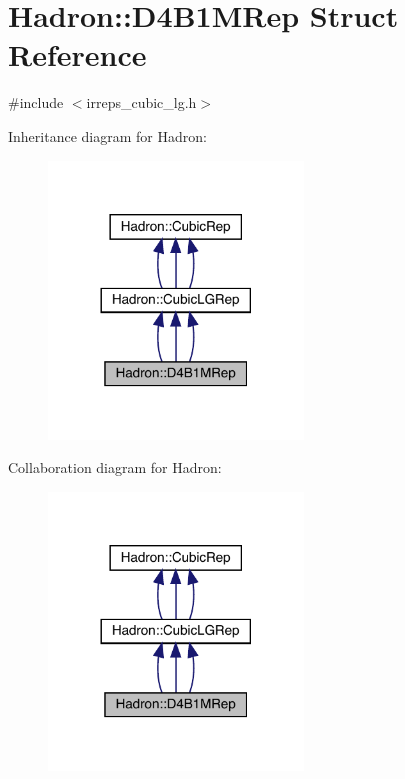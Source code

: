 \hypertarget{structHadron_1_1D4B1MRep}{}\section{Hadron\+:\+:D4\+B1\+M\+Rep Struct Reference}
\label{structHadron_1_1D4B1MRep}


{\ttfamily \#include $<$irreps\+\_\+cubic\+\_\+lg.\+h$>$}



Inheritance diagram for Hadron\+:
\nopagebreak
\begin{figure}[H]
\begin{center}
\leavevmode
\includegraphics[width=192pt]{da/d62/structHadron_1_1D4B1MRep__inherit__graph}
\end{center}
\end{figure}


Collaboration diagram for Hadron\+:
\nopagebreak
\begin{figure}[H]
\begin{center}
\leavevmode
\includegraphics[width=192pt]{d1/ded/structHadron_1_1D4B1MRep__coll__graph}
\end{center}
\end{figure}
